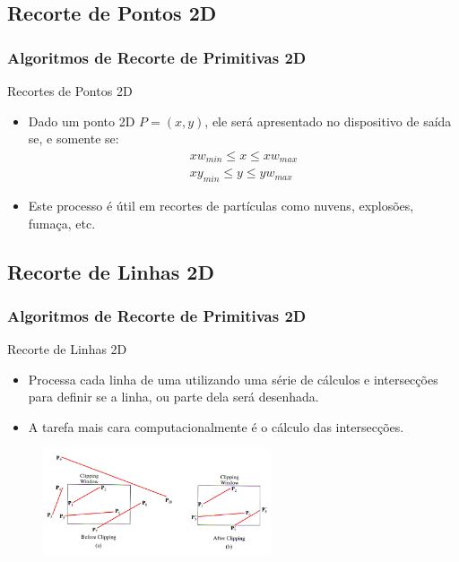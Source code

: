 \documentclass{beamer}
\begin{document}
\subsection{Recorte de Pontos 2D}
\begin{frame}
\frametitle{Algoritmos de Recorte de Primitivas 2D}

	\begin{block}{Recortes de Pontos 2D}
		\begin{itemize}
			\item Dado um ponto 2D $P=(x,y)$, ele será apresentado no dispositivo de saída se, e somente se:
			\begin{eqnarray*}
				xw_{min}  \leq x \leq xw_{max} \\
				xy_{min}  \leq y \leq yw_{max}
			\end{eqnarray*}
			\item Este processo é útil em recortes de partículas como nuvens, explosões, fumaça, etc.
		\end{itemize}
	\end{block}
\end{frame}

\subsection{Recorte de Linhas 2D}
\begin{frame}
\frametitle{Algoritmos de Recorte de Primitivas 2D}

	\begin{block}{Recorte de Linhas 2D}
		\begin{itemize}
			\item Processa cada linha de uma utilizando uma série de cálculos e intersecções para definir se a linha, ou parte dela será desenhada.
			\item A tarefa mais cara computacionalmente é o cálculo das intersecções.
		\end{itemize}
	\end{block}
	
	\begin{figure}[!h]
			\begin{center}
				\includegraphics[width=0.6\textwidth]{Figures/LinCli}
			\end{center}
	\end{figure}	
\end{frame}
\end{document}
